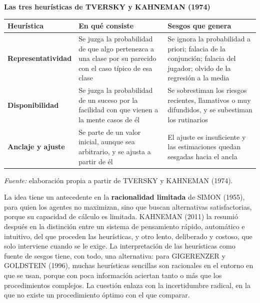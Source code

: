 \documentclass[10pt,a4paper]{article}
\begin{document}
\begin{center}\begin{minipage}{\linewidth}\centering
{\small\textbf{Las tres heurísticas de TVERSKY y KAHNEMAN (1974)}}\par\vspace{0.3em}
{\footnotesize\setlength{\tabcolsep}{5pt}\renewcommand{\arraystretch}{1.35}\def\R{\raggedright}%
\begin{tabular}{|p{2.6cm}|p{5.6cm}|p{5.6cm}|}
\hline
\R\textbf{Heurística} & \R\textbf{En qué consiste} & \R\textbf{Sesgos que genera}\tabularnewline\hline
\R\textbf{Representatividad} & \R Se juzga la probabilidad de que algo pertenezca a una clase por su parecido con el caso típico de esa clase & \R Se ignora la probabilidad a priori; falacia de la conjunción; falacia del jugador; olvido de la regresión a la media\tabularnewline\hline
\R\textbf{Disponibilidad} & \R Se juzga la probabilidad de un suceso por la facilidad con que vienen a la mente casos de él & \R Se sobrestiman los riesgos recientes, llamativos o muy difundidos, y se subestiman los rutinarios\tabularnewline\hline
\R\textbf{Anclaje y ajuste} & \R Se parte de un valor inicial, aunque sea arbitrario, y se ajusta a partir de él & \R El ajuste es insuficiente y las estimaciones quedan sesgadas hacia el ancla\tabularnewline\hline
\end{tabular}}\par\vspace{0.3em}
{\small\textit{Fuente: }elaboración propia a partir de TVERSKY y KAHNEMAN (1974).}
\end{minipage}\end{center}

La idea tiene un antecedente en la \textbf{racionalidad limitada} de SIMON (1955), para quien los agentes no maximizan, sino que buscan alternativas satisfactorias, porque su capacidad de cálculo es limitada. KAHNEMAN (2011) la resumió después en la distinción entre un sistema de pensamiento rápido, automático e intuitivo, del que proceden las heurísticas, y otro lento, deliberado y costoso, que solo interviene cuando se le exige. La interpretación de las heurísticas como fuente de sesgos tiene, con todo, una alternativa: para GIGERENZER y GOLDSTEIN (1996), muchas heurísticas sencillas son racionales en el entorno en que se usan, porque con poca información aciertan tanto o más que los procedimientos complejos. La cuestión enlaza con la incertidumbre radical, en la que no existe un procedimiento óptimo con el que comparar.
\end{document}
